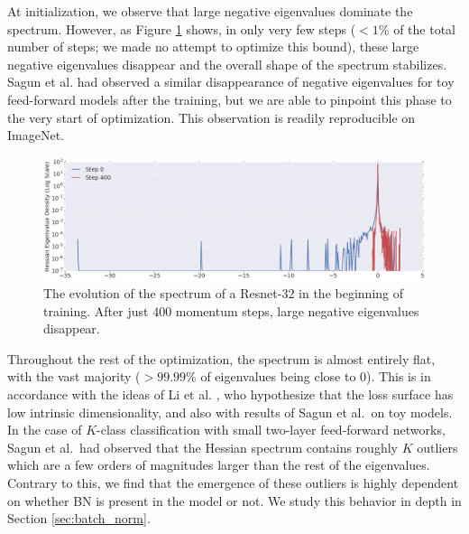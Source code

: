 \documentclass{article}
\begin{document}
At initialization, we observe that large negative eigenvalues dominate the spectrum. However, as Figure \ref{fig:negative_eigenvalues} shows, in only very few steps ($<1\%$ of the total number of steps; we made no attempt to optimize this bound), these large negative eigenvalues disappear and the overall shape of the spectrum stabilizes. Sagun et al. \cite{sagun2016eigenvalues} had observed a similar disappearance of negative eigenvalues for toy feed-forward models after the training, but we are able to pinpoint this phase to the very start of optimization. This observation is readily reproducible on ImageNet.

\begin{figure}[ht]
\includegraphics[width=\textwidth]{ResNet_32_0_400.png}
\vspace{-0.5cm}
\caption{The evolution of the spectrum of a Resnet-32 in the beginning of training. After just $400$ momentum steps, large negative eigenvalues disappear. \label{fig:negative_eigenvalues}}
\end{figure}

Throughout the rest of the optimization, the spectrum is almost entirely flat, with the vast majority ($>99.99\%$ of eigenvalues being close to 0). This is in accordance with the ideas of Li et al. \cite{li2018measuring}, who hypothesize that the loss surface has low intrinsic dimensionality, and also with results of Sagun et al.\ on toy models. In the case of $K$-class classification with small two-layer feed-forward networks, Sagun et al.\  had observed that the Hessian spectrum contains roughly $K$ outliers which are a few orders of magnitudes larger than the rest of the eigenvalues. Contrary to this, we find that the emergence of these outliers is highly dependent on whether BN is present in the model or not. We study this behavior in depth in Section \ref{sec:batch_norm}.
\end{document}
